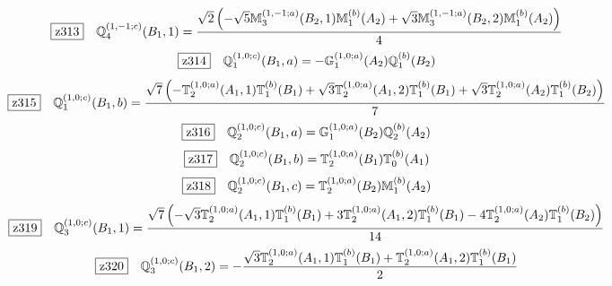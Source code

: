 \documentclass[fleqn,10pt,landscape]{jsarticle}
\begin{document}
\begin{dmath*}
\hspace*{3mm}\fbox{z313}\quad \mathbb{Q}_{4}^{(1,-1;c)}(B_{1},1)=\frac{\sqrt{2} \left(- \sqrt{5} \mathbb{M}_{3}^{(1,-1;a)}(B_{2},1) \mathbb{M}_{1}^{(b)}(A_{2}) + \sqrt{3} \mathbb{M}_{3}^{(1,-1;a)}(B_{2},2) \mathbb{M}_{1}^{(b)}(A_{2})\right)}{4}
\end{dmath*}
\begin{dmath*}
\hspace*{3mm}\fbox{z314}\quad \mathbb{Q}_{1}^{(1,0;c)}(B_{1},a)=- \mathbb{G}_{1}^{(1,0;a)}(A_{2}) \mathbb{Q}_{1}^{(b)}(B_{2})
\end{dmath*}
\begin{dmath*}
\hspace*{3mm}\fbox{z315}\quad \mathbb{Q}_{1}^{(1,0;c)}(B_{1},b)=\frac{\sqrt{7} \left(- \mathbb{T}_{2}^{(1,0;a)}(A_{1},1) \mathbb{T}_{1}^{(b)}(B_{1}) + \sqrt{3} \mathbb{T}_{2}^{(1,0;a)}(A_{1},2) \mathbb{T}_{1}^{(b)}(B_{1}) + \sqrt{3} \mathbb{T}_{2}^{(1,0;a)}(A_{2}) \mathbb{T}_{1}^{(b)}(B_{2})\right)}{7}
\end{dmath*}
\begin{dmath*}
\hspace*{3mm}\fbox{z316}\quad \mathbb{Q}_{2}^{(1,0;c)}(B_{1},a)=\mathbb{G}_{1}^{(1,0;a)}(B_{2}) \mathbb{Q}_{2}^{(b)}(A_{2})
\end{dmath*}
\begin{dmath*}
\hspace*{3mm}\fbox{z317}\quad \mathbb{Q}_{2}^{(1,0;c)}(B_{1},b)=\mathbb{T}_{2}^{(1,0;a)}(B_{1}) \mathbb{T}_{0}^{(b)}(A_{1})
\end{dmath*}
\begin{dmath*}
\hspace*{3mm}\fbox{z318}\quad \mathbb{Q}_{2}^{(1,0;c)}(B_{1},c)=\mathbb{T}_{2}^{(1,0;a)}(B_{2}) \mathbb{M}_{1}^{(b)}(A_{2})
\end{dmath*}
\begin{dmath*}
\hspace*{3mm}\fbox{z319}\quad \mathbb{Q}_{3}^{(1,0;c)}(B_{1},1)=\frac{\sqrt{7} \left(- \sqrt{3} \mathbb{T}_{2}^{(1,0;a)}(A_{1},1) \mathbb{T}_{1}^{(b)}(B_{1}) + 3 \mathbb{T}_{2}^{(1,0;a)}(A_{1},2) \mathbb{T}_{1}^{(b)}(B_{1}) - 4 \mathbb{T}_{2}^{(1,0;a)}(A_{2}) \mathbb{T}_{1}^{(b)}(B_{2})\right)}{14}
\end{dmath*}
\begin{dmath*}
\hspace*{3mm}\fbox{z320}\quad \mathbb{Q}_{3}^{(1,0;c)}(B_{1},2)=- \frac{\sqrt{3} \mathbb{T}_{2}^{(1,0;a)}(A_{1},1) \mathbb{T}_{1}^{(b)}(B_{1}) + \mathbb{T}_{2}^{(1,0;a)}(A_{1},2) \mathbb{T}_{1}^{(b)}(B_{1})}{2}
\end{dmath*}
\end{document}
